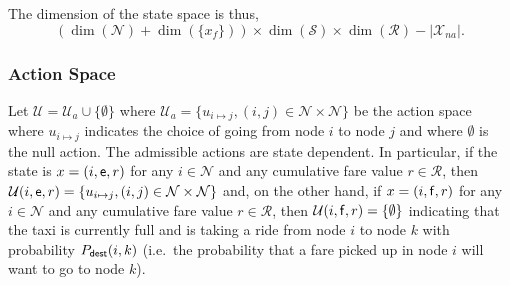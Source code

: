 \documentclass{article}
\newcommand{\mc}{\mathcal}
\newcommand{\sn}[1]{{\sf{#1}}}
\newcommand{\e}{{\sf e}}
\newcommand{\f}{{\sf f}}
\newcommand{\Pdest}{P_{\text{\sn{dest}}}}
\begin{document}
The dimension of the state space is thus, 
\[(\dim(\mc{N})+\dim(\{x_f\}))\times\dim(\mc{S})\times\dim(\mc{R})-|\mc{X}_{na}|.\]


\subsubsection{Action Space}
Let $\mc{U}=\mc{U}_a\cup\{\emptyset\}$ where
$\mc{U}_a=\{u_{i\mapsto j}, (i,j)\in \mc{N}\times \mc{N}\}$ be the action space where $u_{i\mapsto j}$ indicates the choice of going from node $i$ to node $j$ and where $\emptyset$ is the null action. The admissible actions are state dependent. In particular, if the state is $x=(i,\e,r)$ for any $i\in
\mc{N}$ and any cumulative fare value $r\in\mc{R}$, then $\mc{U}(i,\e,r)=\{u_{i\mapsto j}, (i,j)\in \mc{N}\times \mc{N}\}$ and, on the other hand, if $x=(i,\f,r)$ for any $i\in \mc{N}$ and any cumulative fare value $r\in\mc{R}$, then
$\mc{U}(i,\f,r)=\{\emptyset\}$ indicating that the taxi is currently full and is taking a ride from node $i$ to node $k$ with probability $\Pdest(i,k)$ (i.e.~the probability that a fare picked up in node $i$ will want to go to node $k$).
\end{document}
